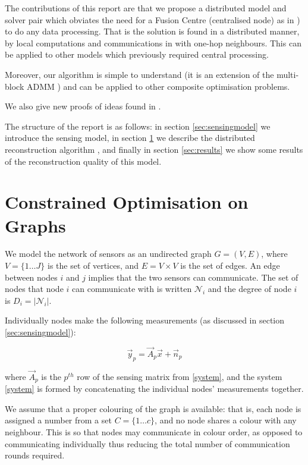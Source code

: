 The contributions of this report are that we propose a distributed model and solver pair which obviates the need for a Fusion Centre (centralised node) as in \cite{Zhang2011b}) to do any data processing. That is the solution is found in a distributed manner, by local computations and communications in with one-hop neighbours. This can be applied to other models which previously required central processing.

Moreover, our algorithm is simple to understand (it is an extension of the multi-block ADMM \cite{mota2013d}) and can be applied to other composite optimisation problems.

We also give new proofs of ideas found in \cite{mota2013d}. 

The structure of the report is as follows: in section \ref{sec:sensingmodel} we introduce the sensing model, in section \ref{sec:opt-on-graphs} we describe the distributed reconstruction algorithm \cite{mota2013d}, and finally in section \ref{sec:results} we show some results of the reconstruction quality of this model. 




\section{Constrained Optimisation on Graphs}\label{sec:opt-on-graphs}

We model the network of sensors as an undirected graph \(G = \left(V,E\right)\), where \(V = \{1 \ldots J\}\) is the set of vertices, and \(E = V \times V\) is the set of edges. An edge between nodes \(i\) and \(j\) implies that the two sensors can communicate. The set of nodes that node \(i\) can communicate with is written \(\mathcal{N}_i\) and the degree of node \(i\) is \(D_i = |\mathcal{N}_i|\). 

Individually nodes make the following measurements (as discussed in section \ref{sec:sensingmodel}):

\begin{equation}
\vec{y}_p = \vec{A}_p\vec{x} + \vec{n}_p
\end{equation}

where \(\vec{A}_p\) is the \(p^{th} \) row of the sensing matrix from \eqref{system}, and the system \eqref{system} is formed by concatenating the individual nodes' measurements together.

We assume that a proper colouring of the graph is available: that is, each node is assigned a number from a set \(C = \{1 \ldots c \} \), and no node shares a colour with any neighbour. This is so that nodes may communicate in colour order, as opposed to communicating individually thus reducing the total number of communication rounds required. 

